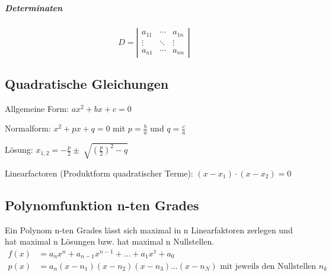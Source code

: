 \subparagraph{Determinaten}
$$
D=\left|
\begin{array}{ccc}
   a_{11} & \cdots & a_{1n} \\
   \vdots & \ddots & \vdots \\
   a_{n1} & \cdots & a_{nn}
\end{array}
\right|
$$



\subsection{Quadratische Gleichungen}
Allgemeine Form:
$ ax^2 + bx + c = 0 $

Normalform:
$ x^2 + px + q = 0 $ mit $p=\frac{b}{a}$ und $q=\frac{c}{a}$

Lösung: $x_{1,2}= - \frac{p}{2} \pm \sqrt[]{( \frac{p}{2})^2 -q }$

Linearfactoren (Produktform quadratischer Terme): $(x-x_1)\cdot (x-x_2 )=0$

\subsection{Polynomfunktion n-ten Grades}
Ein Polynom n-ten Grades lässt sich maximal in n Linearfaktoren zerlegen und hat maximal n Lösungen bzw. hat maximal n Nullstellen.
\begin{align*}
f(x) &= a_nx^n+a_{n-1}x^{n-1}+...+a_1x^1+a_0 \\
p(x) &=a_n(x-n_1)(x-n_2)(x-n_3)...(x-n_N) \textrm{ mit jeweils den Nullstellen } n_k
\end{align*}
